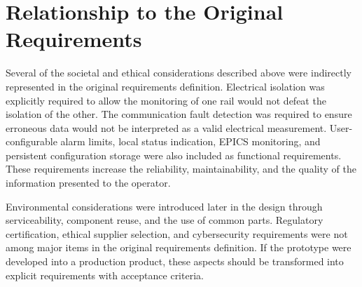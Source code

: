 \section{Relationship to the Original Requirements}

Several of the societal and ethical considerations described above were indirectly represented in the original requirements definition. Electrical
isolation was explicitly required to allow the monitoring of one rail would not defeat the isolation of the other. The communication fault detection was required to ensure erroneous data would not be interpreted as a valid electrical measurement. User-configurable alarm limits, local status indication, EPICS monitoring, and
persistent configuration storage were also included as functional requirements. These requirements increase the reliability, maintainability, and the quality of the
information presented to the operator.

Environmental considerations were introduced later in the design through
serviceability, component reuse, and the use of common parts. Regulatory certification, ethical supplier selection, and cybersecurity requirements were not among major items in the original requirements
definition. If the prototype were developed into a production product, these aspects should be transformed into explicit requirements with acceptance criteria.